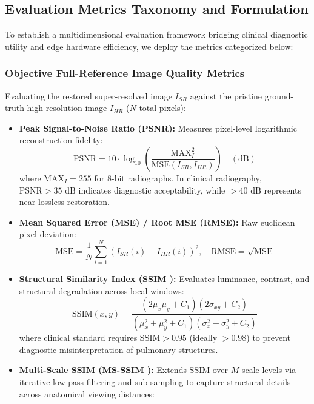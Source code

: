 \documentclass[conference]{IEEEtran}
\begin{document}
\subsection{Evaluation Metrics Taxonomy and Formulation}
\label{sec:metrics_taxonomy}

To establish a multidimensional evaluation framework bridging clinical diagnostic utility and edge hardware efficiency, we deploy the metrics categorized below:

\subsubsection{Objective Full-Reference Image Quality Metrics}
Evaluating the restored super-resolved image $I_{SR}$ against the pristine ground-truth high-resolution image $I_{HR}$ ($N$ total pixels):
\begin{itemize}
    \item \textbf{Peak Signal-to-Noise Ratio (PSNR):} Measures pixel-level logarithmic reconstruction fidelity:
    \begin{equation}
        \text{PSNR} = 10 \cdot \log_{10}\left( \frac{\text{MAX}_I^2}{\text{MSE}(I_{SR}, I_{HR})} \right) \quad (\text{dB})
    \end{equation}
    where $\text{MAX}_I = 255$ for 8-bit radiographs. In clinical radiography, $\text{PSNR} > 35\text{ dB}$ indicates diagnostic acceptability, while $> 40\text{ dB}$ represents near-lossless restoration.
    \item \textbf{Mean Squared Error (MSE) / Root MSE (RMSE):} Raw euclidean pixel deviation:
    \begin{equation}
        \text{MSE} = \frac{1}{N}\sum_{i=1}^N \left( I_{SR}(i) - I_{HR}(i) \right)^2, \quad \text{RMSE} = \sqrt{\text{MSE}}
    \end{equation}
    \item \textbf{Structural Similarity Index (SSIM \cite{wang2004image}):} Evaluates luminance, contrast, and structural degradation across local windows:
    \begin{equation}
        \text{SSIM}(x,y) = \frac{(2\mu_x\mu_y + C_1)(2\sigma_{xy} + C_2)}{(\mu_x^2 + \mu_y^2 + C_1)(\sigma_x^2 + \sigma_y^2 + C_2)}
    \end{equation}
    where clinical standard requires $\text{SSIM} > 0.95$ (ideally $> 0.98$) to prevent diagnostic misinterpretation of pulmonary structures.
    \item \textbf{Multi-Scale SSIM (MS-SSIM \cite{wang2003multiscale}):} Extends SSIM over $M$ scale levels via iterative low-pass filtering and sub-sampling to capture structural details across anatomical viewing distances:

\end{itemize}
\end{document}
